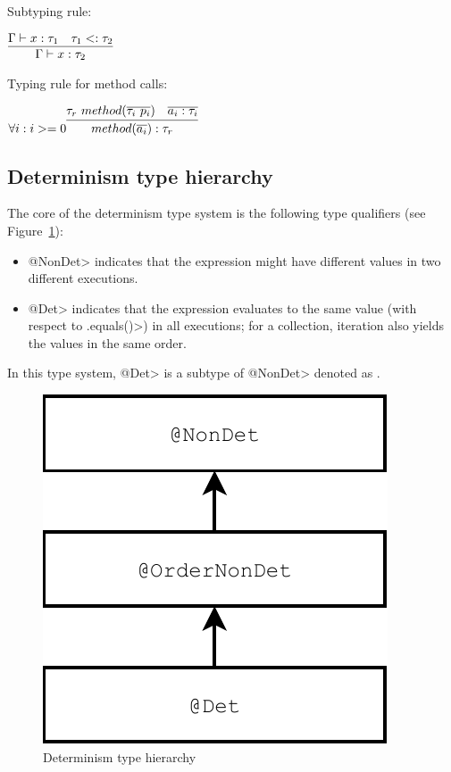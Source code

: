 Subtyping rule:

$\infer{\Gamma \vdash x : \tau_2}{\Gamma \vdash x : \tau_1 & \tau_1 <: \tau_2}$

Typing rule for method calls:

$\forall i : i >= 0 \infer{method(\overline{a_i}) : \tau_r}{\tau_r \  method(\overline{\tau_i \  p_i}) & \overline{a_i : \tau_i}}$

\subsection{Determinism type hierarchy}\label{type-hierarchy}
The core of the determinism type system is the following type qualifiers (see Figure~\ref{fig-determinism-hierarchy}):
\begin{itemize}
    \item \<@NonDet> indicates
    that the expression might have different values in two different executions.
    \item \<@Det> indicates that
    the expression evaluates to the same value (with respect to \<.equals()>) in all
    executions; for a collection, iteration also yields the values in the same
    order.
\end{itemize}

In this type system, \<@Det> is a subtype of \<@NonDet> denoted as .

\begin{figure}
    \begin{center}
        \includegraphics[scale=0.5]{determinism}
    \end{center}
    \caption{Determinism type hierarchy}
    \label{fig-determinism-hierarchy}
\end{figure}

